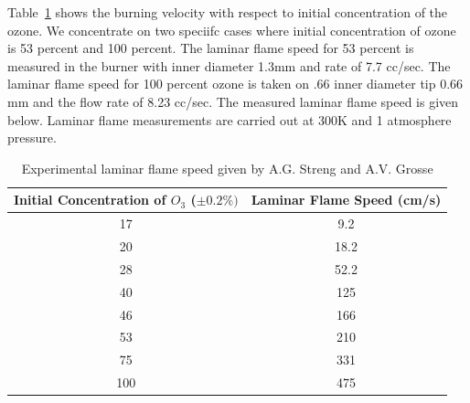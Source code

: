 
Table~\ref{tab:ozone-flame-data} shows the burning
velocity with respect to initial concentration of the ozone. We
concentrate on two speciifc cases where initial concentration of ozone
is 53 percent and 100 percent. The laminar flame speed for 53 percent
is measured in the burner with inner diameter 1.3mm and rate of 7.7
cc/sec. The laminar flame speed for 100 percent ozone is taken on .66
inner diameter tip 0.66 mm and the flow rate of 8.23 cc/sec.  The
measured laminar flame speed is given below. Laminar flame
measurements are carried out at 300K and 1 atmosphere pressure.

\begin{table}[h]
\caption {Experimental laminar flame speed given by A.G. Streng and
  A.V. Grosse\cite{Streng}} \label{tab:ozone-flame-data}
\begin{center}

\begin{tabular}{|c|c|}
\hline \textbf{ Initial Concentration of $O_3$ ($\pm 0.2 \% )$} &
\textbf{ Laminar Flame Speed (cm/s)} \\ \hline 17& 9.2 \\ \hline 20&
18.2 \\ \hline 28& 52.2 \\ \hline 40& 125 \\ \hline 46& 166 \\ \hline
53& 210 \\ \hline 75& 331 \\ \hline 100& 475 \\ \hline
\end{tabular}
\end{center}
\end{table}
